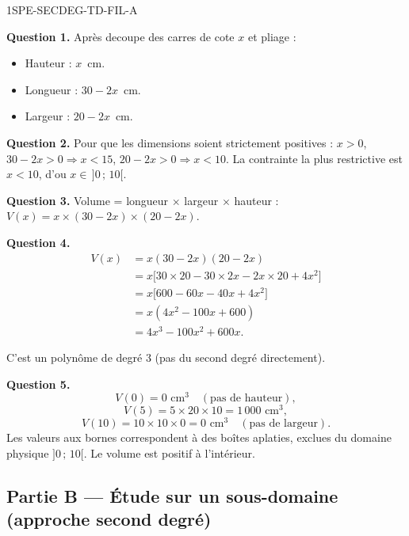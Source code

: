 
\begin{corrige}{1SPE-SECDEG-TD-FIL-A}

\textbf{Question 1.} Après decoupe des carres de cote $x$ et pliage :
\begin{itemize}
  \item Hauteur : $x$~cm.
  \item Longueur : $30 - 2x$~cm.
  \item Largeur : $20 - 2x$~cm.
\end{itemize}

\textbf{Question 2.} Pour que les dimensions soient strictement positives :
$x > 0$, $30 - 2x > 0 \Rightarrow x < 15$, $20 - 2x > 0 \Rightarrow x < 10$.
La contrainte la plus restrictive est $x < 10$, d'ou $x \in \,]0\,;\,10[$.

\textbf{Question 3.} Volume = longueur $\times$ largeur $\times$ hauteur :
$V(x) = x \times (30-2x) \times (20-2x)$.

\textbf{Question 4.}
\begin{align*}
V(x) &= x(30-2x)(20-2x) \\
&= x\bigl[30 \times 20 - 30 \times 2x - 2x \times 20 + 4x^2\bigr] \\
&= x\bigl[600 - 60x - 40x + 4x^2\bigr] \\
&= x(4x^2 - 100x + 600) \\
&= 4x^3 - 100x^2 + 600x.
\end{align*}

C'est un polynôme de degré $3$ (pas du second degré directement).

\textbf{Question 5.}
\[
V(0) = 0 \text{ cm}^3 \quad (\text{pas de hauteur}),
\]
\[
V(5) = 5 \times 20 \times 10 = 1\,000 \text{ cm}^3,
\]
\[
V(10) = 10 \times 10 \times 0 = 0 \text{ cm}^3 \quad (\text{pas de largeur}).
\]
Les valeurs aux bornes correspondent à des boîtes aplaties, exclues du domaine
physique $]0\,;\,10[$. Le volume est positif à l'intérieur.

\end{corrige}

\bigskip

\subsection*{Partie B — Étude sur un sous-domaine (approche second degré)}

